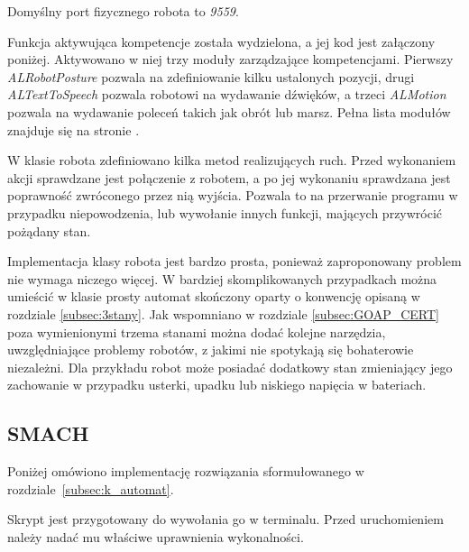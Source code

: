Domyślny port fizycznego robota to \textit{9559}. %



Funkcja aktywująca kompetencje została wydzielona, a jej kod jest załączony poniżej. Aktywowano w niej trzy moduły zarządzające kompetencjami. Pierwszy \textit{ALRobotPosture} pozwala na zdefiniowanie kilku ustalonych pozycji, drugi \textit{ALTextToSpeech} pozwala robotowi na wydawanie dźwięków, a trzeci \textit{ALMotion} pozwala na wydawanie poleceń takich jak obrót lub marsz. Pełna lista modułów znajduje się na stronie \cite{NAOqimodules}. 


W klasie robota zdefiniowano kilka metod realizujących ruch. 
Przed wykonaniem akcji sprawdzane jest połączenie z robotem, a po jej wykonaniu sprawdzana jest poprawność zwróconego przez nią wyjścia. Pozwala to na przerwanie programu w przypadku niepowodzenia, lub wywołanie innych funkcji, mających przywrócić pożądany stan. 



Implementacja klasy robota jest bardzo prosta, ponieważ zaproponowany problem nie wymaga niczego więcej. W bardziej skomplikowanych przypadkach można umieścić w klasie prosty automat skończony oparty o konwencję opisaną w rozdziale \ref{subsec:3stany}. Jak wspomniano w rozdziale \ref{subsec:GOAP_CERT} poza wymienionymi trzema stanami można dodać kolejne narzędzia, uwzględniające problemy robotów, z jakimi nie spotykają się bohaterowie niezależni. Dla przykładu robot może posiadać dodatkowy stan zmieniający jego zachowanie w przypadku usterki, upadku lub niskiego napięcia w bateriach. 

\subsection{SMACH}
\label{subsec:i_automat}
Poniżej omówiono implementację rozwiązania sformułowanego w rozdziale~\ref{subsec:k_automat}. 

Skrypt jest przygotowany do wywołania go w terminalu. Przed uruchomieniem należy nadać mu właściwe uprawnienia wykonalności. 


